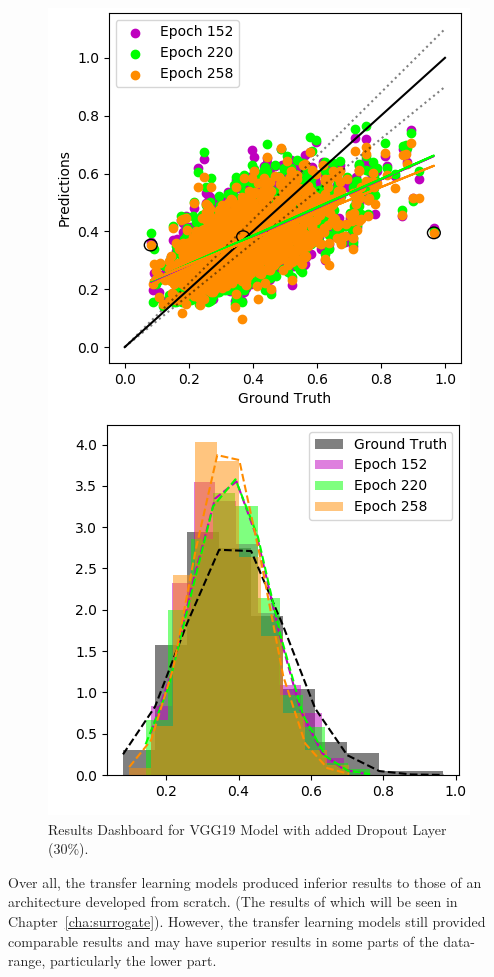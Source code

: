 \begin{figure}[p]
	\centering
	\includegraphics[scale=0.7]{Figures/transfer3.png}
	\caption{Results Dashboard for VGG19 Model with added Dropout Layer (30\%).}
	\label{fig:results_transfer}
\end{figure}

\noindent
Over all, the transfer learning models produced inferior results to those of an architecture developed from scratch. (The results of which will be seen in Chapter~\ref{cha:surrogate}). However, the transfer learning models still provided comparable results and may have superior results in some parts of the data-range, particularly the lower part.

